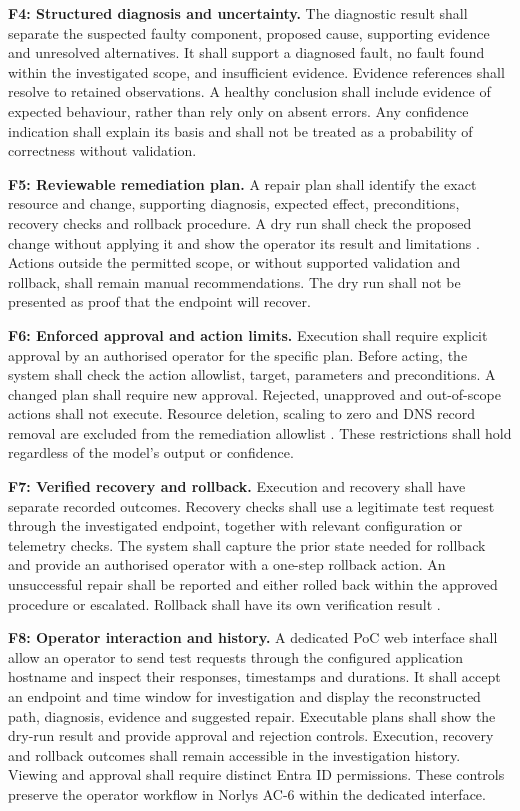 \noindent\textbf{F4: Structured diagnosis and uncertainty.}
The diagnostic result shall separate the suspected faulty component,
proposed cause, supporting evidence and unresolved alternatives. It shall
support a diagnosed fault, no fault found within the investigated scope,
and insufficient evidence. Evidence references shall resolve to retained
observations. A healthy conclusion shall include evidence of expected
behaviour, rather than rely only on absent errors. Any confidence
indication shall explain its basis and shall not be treated as a
probability of correctness without validation.

\noindent\textbf{F5: Reviewable remediation plan.}
A repair plan shall identify the exact resource and change, supporting
diagnosis, expected effect, preconditions, recovery checks and rollback
procedure. A dry run shall check the proposed change without applying it
and show the operator its result and limitations
\parencite[AC-5]{norlys_operations_agents}. Actions outside the permitted
scope, or without supported validation and rollback, shall remain manual
recommendations. The dry run shall not be presented as proof that the
endpoint will recover.

\noindent\textbf{F6: Enforced approval and action limits.}
Execution shall require explicit approval by an authorised operator for
the specific plan. Before acting, the system shall check the action
allowlist, target, parameters and preconditions. A changed plan shall
require new approval. Rejected, unapproved and out-of-scope actions shall
not execute. Resource deletion, scaling to zero and DNS record removal
are excluded from the remediation allowlist
\parencite[AC-5]{norlys_operations_agents}. These restrictions shall hold
regardless of the model's output or confidence.

\noindent\textbf{F7: Verified recovery and rollback.}
Execution and recovery shall have separate recorded outcomes. Recovery
checks shall use a legitimate test request through the investigated
endpoint, together with relevant configuration or telemetry checks.
The system shall capture the prior state needed for rollback and provide
an authorised operator with a one-step rollback action. An unsuccessful
repair shall be reported and either rolled back within the approved
procedure or escalated. Rollback shall have its own verification result
\parencite[AC-5]{norlys_operations_agents}.

\noindent\textbf{F8: Operator interaction and history.}
A dedicated PoC web interface shall allow an operator to send test requests
through the configured application hostname and inspect their responses,
timestamps and durations. It shall accept an endpoint and time window for
investigation and display the reconstructed path, diagnosis, evidence and
suggested repair. Executable plans shall
show the dry-run result and provide approval and rejection controls.
Execution, recovery and rollback outcomes shall remain accessible in the
investigation history. Viewing and approval shall require distinct Entra ID
permissions. These controls preserve the operator workflow in Norlys AC-6
within the dedicated interface.

